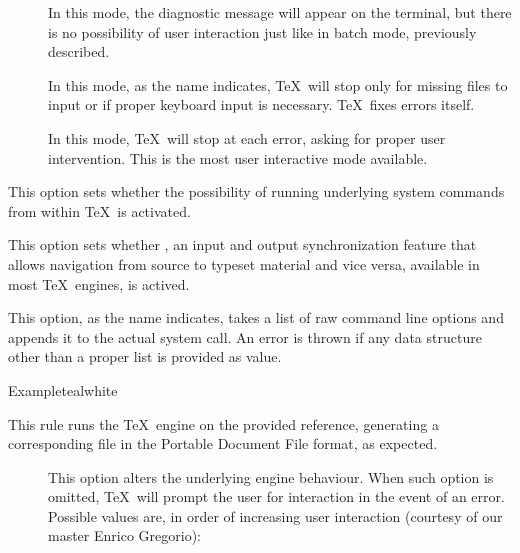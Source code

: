 \begin{description}
\begin{description}
\begin{description}
\item[] In this mode, the diagnostic message will appear on the terminal, but there is no possibility of user interaction just like in batch mode, previously described.

\item[] In this mode, as the name indicates, \TeX\ will stop only for missing files to input or if proper keyboard input is necessary. \TeX\ fixes errors itself.

\item[] In this mode, \TeX\ will stop at each error, asking for proper user intervention. This is the most user interactive mode available.
\end{description}

\item[\rpsbox{shell}] This option sets whether the possibility of running underlying system commands from within \TeX\ is activated.

\item[\rpsbox{synctex}] This option sets whether , an input and output synchronization feature that allows navigation from source to typeset material and vice versa, available in most \TeX\ engines, is actived.

\item[\abox{options}] This option, as the name indicates, takes a list of raw command line options and appends it to the actual system call. An error is thrown if any data structure other than a proper list is provided as value.
\end{description}

\begin{codebox}{Example}{teal}{\icnote}{white}
\end{codebox}

\item[\rulebox{xetex}{Marco Daniel, Paulo Cereda}] This rule runs the  \TeX\ engine on the provided  reference, generating a corresponding file in the Portable Document File format, as expected.

\begin{description}
\item[] This option alters the underlying engine behaviour. When such option is omitted, \TeX\ will prompt the user for interaction in the event of an error. Possible values are, in order of increasing user interaction (courtesy of our master Enrico Gregorio):


\end{description}
\end{description}
